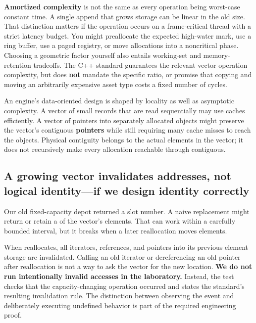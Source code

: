 \textbf{Amortized complexity} is not the same as every operation being worst-case constant time. A single append that grows storage can be linear in the old size. That distinction matters if the operation occurs on a frame-critical thread with a strict latency budget. You might preallocate the expected high-water mark, use a ring buffer, use a paged registry, or move allocations into a noncritical phase. Choosing a geometric factor yourself also entails working-set and memory-retention tradeoffs. The C++ standard guarantees the relevant vector operation complexity, but does \textbf{not} mandate the specific ratio, or promise that copying and moving an arbitrarily expensive asset type costs a fixed number of cycles.

An engine's data-oriented design is shaped by locality as well as asymptotic complexity. A vector of small records that are read sequentially may use caches efficiently. A vector of pointers into separately allocated objects might preserve the vector's contiguous \textbf{pointers} while still requiring many cache misses to reach the objects. Physical contiguity belongs to the actual  elements in the vector; it does not recursively make every allocation reachable through  contiguous.

\subsection{A growing vector invalidates addresses, not logical identity---if we design identity correctly}\label{05-engine-i-ch005-a-growing-vector-invalidates-addresses-not-logical-identityif-we-design-identity-correctly}

\hypertarget{05-engine-i-ch005-a-growing-vector-invalidates-addresses-not-logical-identityif-we-design-identity-correctly}{}

Our old fixed-capacity depot returned a slot number. A naive replacement might return  or retain a  of the vector's elements. That can work within a carefully bounded interval, but it breaks when a later reallocation moves elements.

When  reallocates, all iterators, references, and pointers into its previous element storage are invalidated. Calling an old iterator or dereferencing an old pointer after reallocation is not a way to ask the vector for the new location. \textbf{We do not run intentionally invalid accesses in the laboratory.} Instead, the test checks that the capacity-changing operation occurred and states the standard's resulting invalidation rule. The distinction between observing the event and deliberately executing undefined behavior is part of the required engineering proof.

